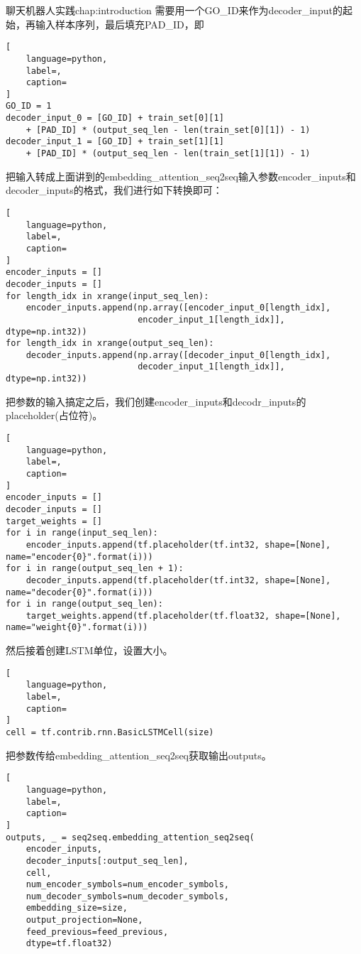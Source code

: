 \begin{cuzchapter}{聊天机器人实践}{chap:introduction}
需要用一个GO\_ID来作为decoder\_input的起始，再输入样本序列，最后填充PAD\_ID，即
\begin{lstlisting}[
    language=python,
    label=,
    caption=
]
GO_ID = 1
decoder_input_0 = [GO_ID] + train_set[0][1] 
    + [PAD_ID] * (output_seq_len - len(train_set[0][1]) - 1)
decoder_input_1 = [GO_ID] + train_set[1][1] 
    + [PAD_ID] * (output_seq_len - len(train_set[1][1]) - 1)
\end{lstlisting}

把输入转成上面讲到的embedding\_attention\_seq2seq输入参数encoder\_inputs和decoder\_inputs的格式，我们进行如下转换即可：
\begin{lstlisting}[
    language=python,
    label=,
    caption=
]
encoder_inputs = []
decoder_inputs = []
for length_idx in xrange(input_seq_len):
    encoder_inputs.append(np.array([encoder_input_0[length_idx], 
                          encoder_input_1[length_idx]], dtype=np.int32))
for length_idx in xrange(output_seq_len):
    decoder_inputs.append(np.array([decoder_input_0[length_idx], 
                          decoder_input_1[length_idx]], dtype=np.int32))
\end{lstlisting}

把参数的输入搞定之后，我们创建encoder\_inputs和decodr\_inputs的placeholder(占位符)。
\begin{lstlisting}[
    language=python,
    label=,
    caption=
]
encoder_inputs = []
decoder_inputs = []
target_weights = []
for i in range(input_seq_len):
    encoder_inputs.append(tf.placeholder(tf.int32, shape=[None], name="encoder{0}".format(i)))
for i in range(output_seq_len + 1):
    decoder_inputs.append(tf.placeholder(tf.int32, shape=[None], name="decoder{0}".format(i)))
for i in range(output_seq_len):
    target_weights.append(tf.placeholder(tf.float32, shape=[None], name="weight{0}".format(i)))
\end{lstlisting}

然后接着创建LSTM单位，设置大小。
\begin{lstlisting}[
    language=python,
    label=,
    caption=
]
cell = tf.contrib.rnn.BasicLSTMCell(size)
\end{lstlisting}

把参数传给embedding\_attention\_seq2seq获取输出outputs。
\begin{lstlisting}[
    language=python,
    label=,
    caption=
]
outputs, _ = seq2seq.embedding_attention_seq2seq(
    encoder_inputs,
    decoder_inputs[:output_seq_len],
    cell,
    num_encoder_symbols=num_encoder_symbols,
    num_decoder_symbols=num_decoder_symbols,
    embedding_size=size,
    output_projection=None,
    feed_previous=feed_previous,
    dtype=tf.float32)
\end{lstlisting}


\end{cuzchapter}
